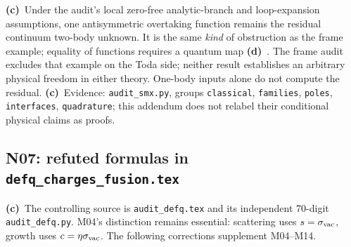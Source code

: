 \documentclass[11pt,a4paper]{article}
\newcommand{\C}{\textbf{(c)}\ }
\newcommand{\D}{\textbf{(d)}\ }
\newcommand{\file}[1]{\nolinkurl{#1}}
\begin{document}
\C Under the audit's local zero-free analytic-branch and loop-expansion
assumptions, one antisymmetric overtaking function remains the residual
continuum two-body unknown. It is the same \emph{kind} of obstruction as the
frame example; equality of functions requires a quantum map \D. The frame
audit excludes that example on the Toda side; neither result establishes an
arbitrary physical freedom in either theory. One-body inputs alone do not
compute the residual. \C Evidence: \file{audit_smx.py}, groups
\file{classical}, \file{families}, \file{poles}, \file{interfaces},
\file{quadrature}; this addendum does not relabel their conditional physical
claims as proofs.

\subsection{N07: refuted formulas in \file{defq_charges_fusion.tex}}
\C The controlling source is \file{audit_defq.tex} and its independent
70-digit \file{audit_defq.py}. M04's distinction remains essential:
scattering uses $s=\sigma_{\rm vac}$, growth uses $c=\eta\sigma_{\rm vac}$.
The following corrections supplement M04--M14.
\end{document}
